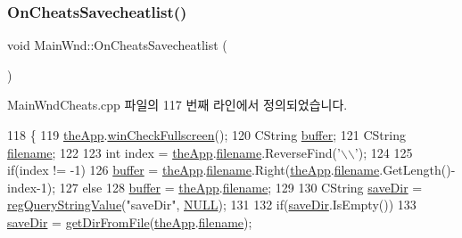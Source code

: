 \subsubsection{\texorpdfstring{On\+Cheats\+Savecheatlist()}{OnCheatsSavecheatlist()}}
{\footnotesize\ttfamily void Main\+Wnd\+::\+On\+Cheats\+Savecheatlist (\begin{DoxyParamCaption}{ }\end{DoxyParamCaption})\hspace{0.3cm}{\ttfamily [protected]}}



Main\+Wnd\+Cheats.\+cpp 파일의 117 번째 라인에서 정의되었습니다.


\begin{DoxyCode}
118 \{
119   \mbox{\hyperlink{_v_b_a_8cpp_a8095a9d06b37a7efe3723f3218ad8fb3}{theApp}}.\mbox{\hyperlink{class_v_b_a_a340eaeeb7fcfc242f08ac3442d991a96}{winCheckFullscreen}}();
120   CString \mbox{\hyperlink{_g_b_a_8cpp_a28d4d3d8445e73a696b2d6f7eadabd96}{buffer}};
121   CString \mbox{\hyperlink{_s_d_l_8cpp_ac33a174c39700095ca0f892624d85a3f}{filename}};
122 
123   \textcolor{keywordtype}{int} index = \mbox{\hyperlink{_v_b_a_8cpp_a8095a9d06b37a7efe3723f3218ad8fb3}{theApp}}.\mbox{\hyperlink{class_v_b_a_a66eee6b61ec8bee20f21164cb0c37d2d}{filename}}.ReverseFind(\textcolor{charliteral}{'\(\backslash\)\(\backslash\)'});
124 
125   \textcolor{keywordflow}{if}(index != -1)
126     \mbox{\hyperlink{_g_b_a_8cpp_a28d4d3d8445e73a696b2d6f7eadabd96}{buffer}} = \mbox{\hyperlink{_v_b_a_8cpp_a8095a9d06b37a7efe3723f3218ad8fb3}{theApp}}.\mbox{\hyperlink{class_v_b_a_a66eee6b61ec8bee20f21164cb0c37d2d}{filename}}.Right(\mbox{\hyperlink{_v_b_a_8cpp_a8095a9d06b37a7efe3723f3218ad8fb3}{theApp}}.\mbox{\hyperlink{class_v_b_a_a66eee6b61ec8bee20f21164cb0c37d2d}{filename}}.GetLength()-index-1);
127   \textcolor{keywordflow}{else}
128     \mbox{\hyperlink{_g_b_a_8cpp_a28d4d3d8445e73a696b2d6f7eadabd96}{buffer}} = \mbox{\hyperlink{_v_b_a_8cpp_a8095a9d06b37a7efe3723f3218ad8fb3}{theApp}}.\mbox{\hyperlink{class_v_b_a_a66eee6b61ec8bee20f21164cb0c37d2d}{filename}};
129 
130   CString \mbox{\hyperlink{_s_d_l_8cpp_a7b37d94db9ce90c610565cb80ff50444}{saveDir}} = \mbox{\hyperlink{_reg_8cpp_a618826d274df0d9c19fab2ff28bd9008}{regQueryStringValue}}(\textcolor{stringliteral}{"saveDir"}, 
      \mbox{\hyperlink{getopt1_8c_a070d2ce7b6bb7e5c05602aa8c308d0c4}{NULL}});
131 
132   \textcolor{keywordflow}{if}(\mbox{\hyperlink{_s_d_l_8cpp_a7b37d94db9ce90c610565cb80ff50444}{saveDir}}.IsEmpty())
133     \mbox{\hyperlink{_s_d_l_8cpp_a7b37d94db9ce90c610565cb80ff50444}{saveDir}} = \mbox{\hyperlink{class_main_wnd_a55c4858ec2c3f621790c9c7aec67011e}{getDirFromFile}}(\mbox{\hyperlink{_v_b_a_8cpp_a8095a9d06b37a7efe3723f3218ad8fb3}{theApp}}.\mbox{\hyperlink{class_v_b_a_a66eee6b61ec8bee20f21164cb0c37d2d}{filename}});

\end{DoxyCode}
